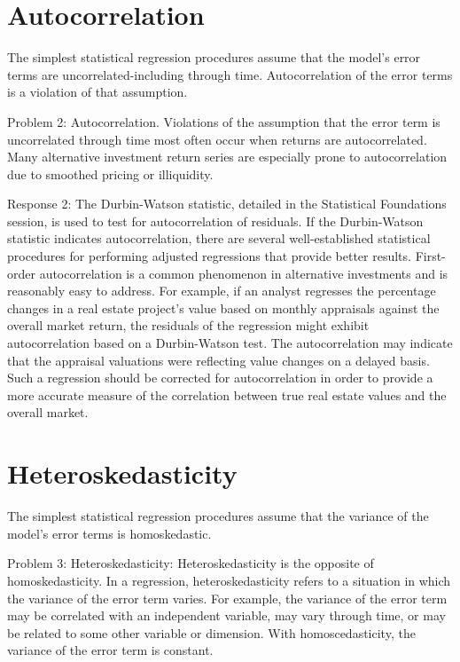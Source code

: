\documentclass[11pt]{article}
\begin{document}
\section*{Autocorrelation}
The simplest statistical regression procedures assume that the model's error terms are uncorrelated-including through time. Autocorrelation of the error terms is a violation of that assumption.

Problem 2: Autocorrelation. Violations of the assumption that the error term is uncorrelated through time most often occur when returns are autocorrelated. Many alternative investment return series are especially prone to autocorrelation due to smoothed pricing or illiquidity.

Response 2: The Durbin-Watson statistic, detailed in the Statistical Foundations session, is used to test for autocorrelation of residuals. If the Durbin-Watson statistic indicates autocorrelation, there are several well-established statistical procedures for performing adjusted regressions that provide better results. First-order autocorrelation is a common phenomenon in alternative investments and is reasonably easy to address. For example, if an analyst regresses the percentage changes in a real estate project's value based on monthly appraisals against the overall market return, the residuals of the regression might exhibit autocorrelation based on a Durbin-Watson test. The autocorrelation may indicate that the appraisal valuations were reflecting value changes on a delayed basis. Such a regression should be corrected for autocorrelation in order to provide a more accurate measure of the correlation between true real estate values and the overall market.

\section*{Heteroskedasticity}
The simplest statistical regression procedures assume that the variance of the model's error terms is homoskedastic.

Problem 3: Heteroskedasticity: Heteroskedasticity is the opposite of homoskedasticity. In a regression, heteroskedasticity refers to a situation in which the variance of the error term varies. For example, the variance of the error term may be correlated with an independent variable, may vary through time, or may be related to some other variable or dimension. With homoscedasticity, the variance of the error term is constant.
\end{document}
